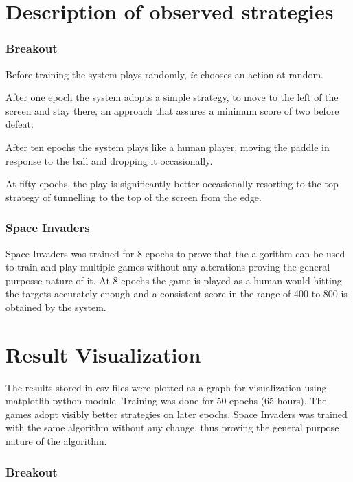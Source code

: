 \documentclass[a4paper,11pt]{report}
\begin{document}
		\section{Description of observed strategies}
			\subsubsection{Breakout}
				Before training the system plays randomly, \emph{ie} chooses an action at random. 

				After one epoch the system adopts a simple strategy, to move to the left of the screen and stay there, an approach that assures a minimum score of two before defeat.

				After ten epochs the system plays like a human player, moving the paddle in response to the ball and dropping it occasionally.

				At fifty epochs, the play is significantly better occasionally resorting to the top strategy of tunnelling to the top of the screen from the edge.

			\subsubsection{Space Invaders}
				Space Invaders was trained for 8 epochs to prove that the algorithm can be used to train and play multiple games without any alterations proving the general purposse nature of it. At 8 epochs the game is played as a human would hitting the targets accurately enough and a consistent score in the range of 400 to 800 is obtained by the system.

		\section{Result Visualization}

			The results stored in csv files were plotted as a graph for visualization using matplotlib python module. Training was done for 50 epochs (65 hours). The games adopt visibly better strategies on later epochs. Space Invaders was trained with the same algorithm without any change, thus proving the general purpose nature of the algorithm.
			
			\newpage
			\subsubsection{Breakout}
\end{document}
